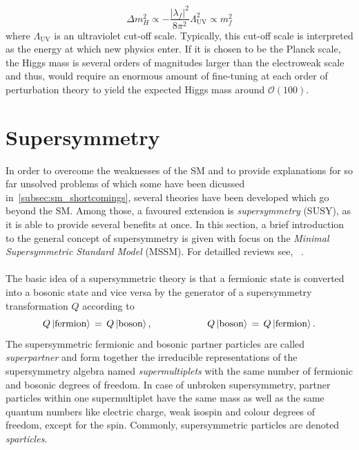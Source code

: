\begin{description}
\begin{equation}
\label{eq:hierarchy}
\Delta m_H^2 \propto -\frac{|\lambda_f|^2}{8\pi^2}\Lambda_\mathrm{UV}^2 \propto m_f^2
\end{equation}
 where $\Lambda_\mathrm{UV}$ is an ultraviolet cut-off scale. Typically, this cut-off scale is interpreted as the energy at which new physics enter. If it is chosen to be the Planck scale, the Higgs mass is several orders of magnitudes larger than the electroweak scale and thus, would require an enormous amount of fine-tuning at each order of perturbation theory to yield the expected Higgs mass around $\mathcal{O}(100)$\gev. 
\end{description} 

\section{Supersymmetry}
\label{sec:susy}
In order to overcome the weaknesses of the SM and to provide explanations for so far unsolved problems of which some have been dicussed in~\ref{subsec:sm_shortcomings}, several theories have been developed which go beyond the SM. Among those, a favoured extension is \textit{supersymmetry} (SUSY), as it is able to provide several benefits at once. In this section, a brief introduction to the general concept of supersymmetry is given with focus on the \textit{Minimal Supersymmetric Standard Model} (MSSM). For detailled reviews see, \eg~\cite{Aitchison:2005cf, Martin:1997ns}.\\ 
\\
The basic idea of a supersymmetric theory is that a fermionic state is converted into a bosonic state and vice versa by the generator of a supersymmetry transformation $Q$ according to
\begin{equation*}
Q \ket{\mathrm{fermion}} \, = \, Q \ket{\mathrm{boson}}, \hspace{20mm} Q \ket{\mathrm{boson}} \, = \, Q \ket{\mathrm{fermion}}.
\end{equation*}
The supersymmetric fermionic and bosonic partner particles are called \textit{superpartner} and form together the irreducible representations of the supersymmetry algebra named \textit{supermultiplets} with the same number of fermionic and bosonic degrees of freedom. In case of unbroken supersymmetry, partner particles within one supermultiplet have the same mass as well as the same quantum numbers like electric charge, weak isospin and colour degrees of freedom, except for the spin. Commonly, supersymmetric particles are denoted \textit{sparticles}. \\
